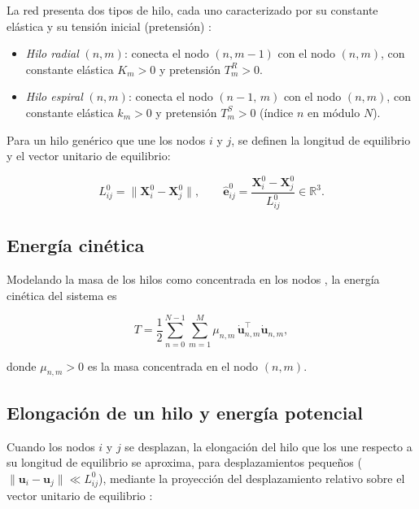\documentclass[11pt,letterpaper]{article}
\begin{document}
La red presenta dos tipos de hilo, cada uno caracterizado por su constante
elástica y su tensión inicial (pretensión) \cite{aoyanagi2010,soler2016}:

\begin{itemize}
    \item \emph{Hilo radial} $(n,m)$: conecta el nodo $(n,m-1)$ con el
    nodo $(n,m)$, con constante elástica $K_m > 0$ y pretensión
    $T^R_m > 0$.
    \item \emph{Hilo espiral} $(n,m)$: conecta el nodo $(n-1,\,m)$ con el
    nodo $(n,m)$, con constante elástica $k_m > 0$ y pretensión
    $T^S_m > 0$ (índice $n$ en módulo $N$).
\end{itemize}

Para un hilo genérico que une los nodos $i$ y $j$, se definen la longitud
de equilibrio y el vector unitario de equilibrio:

\begin{equation}\label{eq:L0}
    L^0_{ij} = \lVert \mathbf{X}^0_i - \mathbf{X}^0_j \rVert,
    \qquad
    \hat{\mathbf{e}}^0_{ij}
    = \frac{\mathbf{X}^0_i - \mathbf{X}^0_j}{L^0_{ij}}
    \in \mathbb{R}^3.
\end{equation}

\subsection{Energía cinética}

Modelando la masa de los hilos como concentrada en los nodos \cite{meirovitch2001},
la energía cinética del sistema es

\begin{equation}\label{eq:T}
    T = \frac{1}{2}
        \sum_{n=0}^{N-1}\sum_{m=1}^{M}
        \mu_{n,m}\,\dot{\mathbf{u}}_{n,m}^{\top}\dot{\mathbf{u}}_{n,m},
\end{equation}

donde $\mu_{n,m} > 0$ es la masa concentrada en el nodo $(n,m)$.

\subsection{Elongación de un hilo y energía potencial}

Cuando los nodos $i$ y $j$ se desplazan, la elongación del hilo que los
une respecto a su longitud de equilibrio se aproxima, para desplazamientos
pequeños ($\lVert\mathbf{u}_i - \mathbf{u}_j\rVert \ll L^0_{ij}$),
mediante la proyección del desplazamiento relativo sobre el vector unitario
de equilibrio \cite{goldstein2002,meirovitch2001}:
\end{document}
